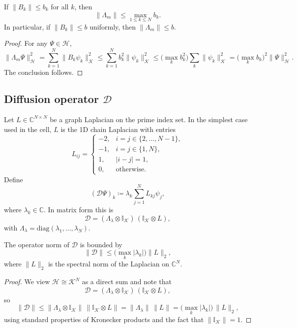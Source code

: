 \documentclass[11pt]{article}
\begin{document}
\begin{lemma}
\label{lem:Lm-norm}
If \(\|B_k\| \le b_k\) for all \(k\), then
\[
\|\Lambda_m\| \le \max_{1\le k\le N} b_k.
\]
In particular, if \(\|B_k\|\le b\) uniformly, then \(\|\Lambda_m\|\le b\).
\end{lemma}

\begin{proof}
For any \(\Psi\in\mathcal{H}\),
\[
\|\Lambda_m \Psi\|_{\mathcal{H}}^2
=
\sum_{k=1}^N \|B_k \psi_k\|_{\mathcal{K}}^2
\le
\sum_{k=1}^N b_k^2 \|\psi_k\|_{\mathcal{K}}^2
\le
\bigl(\max_k b_k^2\bigr)\sum_k \|\psi_k\|_{\mathcal{K}}^2
=
\bigl(\max_k b_k\bigr)^2 \|\Psi\|_{\mathcal{H}}^2.
\]
The conclusion follows.
\end{proof}

\subsection{Diffusion operator \(\mathcal{D}\)}

Let \(L \in \mathbb{C}^{N\times N}\) be a graph Laplacian on the prime index set. In the simplest case used in the cell, \(L\) is the 1D chain Laplacian with entries
\[
L_{ij} =
\begin{cases}
-2, & i=j \in \{2,\dots,N-1\},\\
-1, & i=j\in\{1,N\},\\
1,  & |i-j|=1,\\
0,  & \text{otherwise.}
\end{cases}
\]
Define
\begin{equation}
(\mathcal{D}\Psi)_k
\coloneqq
\lambda_k \sum_{j=1}^N L_{kj}\psi_j,
\end{equation}
where \(\lambda_k\in \mathbb{C}\). In matrix form this is
\[
\mathcal{D} = (\Lambda_\lambda \otimes \mathbb{I}_{\mathcal{K}})\,(\mathbb{I}_{\mathcal{K}}\otimes L),
\]
with \(\Lambda_\lambda = \mathrm{diag}(\lambda_1,\dots,\lambda_N)\).

\begin{lemma}
\label{lem:D-norm}
The operator norm of \(\mathcal{D}\) is bounded by
\[
\|\mathcal{D}\|
\le
\bigl(\max_{k} |\lambda_k|\bigr) \|L\|_{2},
\]
where \(\|L\|_2\) is the spectral norm of the Laplacian on \(\mathbb{C}^N\).
\end{lemma}

\begin{proof}
We view \(\mathcal{H}\cong \mathcal{K}^N\) as a direct sum and note that
\[
\mathcal{D}
=
(\Lambda_\lambda \otimes \mathbb{I}_{\mathcal{K}})\,(\mathbb{I}_{\mathcal{K}}\otimes L),
\]
so
\[
\|\mathcal{D}\|
\le
\|\Lambda_\lambda\otimes \mathbb{I}_{\mathcal{K}}\|\,
\|\mathbb{I}_{\mathcal{K}}\otimes L\|
=
\|\Lambda_\lambda\|\,\|L\|
=
\bigl(\max_k|\lambda_k|\bigr)\,\|L\|_2,
\]
using standard properties of Kronecker products and the fact that \(\|\mathbb{I}_{\mathcal{K}}\|=1\).
\end{proof}
\end{document}
